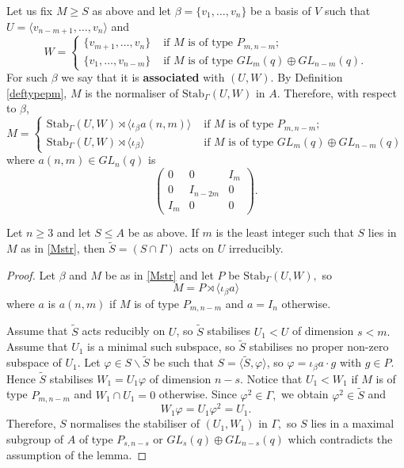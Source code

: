 Let us fix $M\ge S$ as above and let $\beta=\{v_1, \ldots, v_n\}$ be a basis of $V$ such that $U=\langle v_{n-m+1}, \ldots, v_n \rangle$ and 
$$W= \begin{cases}
\{v_{m+1}, \ldots, v_n\} &\text{ if } M \text{ is of type } P_{m, n-m};\\
\{v_1, \ldots, v_{n-m}\} &\text{ if } M \text{ is of type } GL_{m}(q) \oplus GL_{n-m}(q).
\end{cases} 
$$ 
For such $\beta$ we say that it is {\bf associated} with $(U,W).$
 By Definition \ref{deftypepm}, $M$ is the normaliser of $\mathrm{Stab}_{\Gamma}(U,W)$ in $A$. Therefore, with respect to $\beta$,
\begin{equation}
\label{Mstr}
M =\begin{cases}
\mathrm{Stab}_{\Gamma}(U,W) \rtimes \langle \iota_{\beta}a(n,m) \rangle & \text{ if } M \text{ is of type } P_{m, n-m};\\
\mathrm{Stab}_{\Gamma}(U,W) \rtimes \langle \iota_{\beta} \rangle & \text{ if } M \text{ is of type } GL_{m}(q) \oplus GL_{n-m}(q)
\end{cases}
\end{equation}
where $a(n,m) \in GL_n(q)$ is 
\begin{equation}
\label{adef}
\begin{pmatrix}
0 & 0 & I_{m} \\
0 & I_{n-2m} & 0 \\
I_{m} & 0 & 0
\end{pmatrix}.
\end{equation}

\begin{Lem}
\label{GRmmim2}
Let $n\ge 3$ and let $S \le A$ be as above. If $m$ is the least integer such that $S$ lies in $M$ as in \eqref{Mstr}, then 
 $\tilde{S}=(S \cap \Gamma)$ acts  on $U$ irreducibly.
\end{Lem} 
\begin{proof}
Let $\beta$ and $M$ be as in \eqref{Mstr} and let $P$ be $\mathrm{Stab}_{\Gamma}(U,W),$ so 
$$M=P \rtimes \langle \iota_{\beta} a\rangle$$
where $a$ is $a(n,m)$ if $M$ is of type $P_{m,n-m}$ and $a=I_n$ otherwise.


Assume that $\tilde{S}$ acts  reducibly on $U$, so  $\tilde{S}$ stabilises $U_1 <U$ of dimension $s<m.$  Assume that $U_1$ is a minimal such subspace, so $\tilde{S}$ stabilises no proper non-zero subspace of $U_1.$ Let $\varphi \in S \backslash \tilde{S}$ be such that
$S=\langle \tilde{S}, \varphi \rangle$, so $\varphi=\iota_{\beta}a \cdot g$ with $g \in P.$  Hence $\tilde{S}$ stabilises $W_1=U_1 \varphi$ of dimension  $n-s$. Notice that $U_1<W_1$ if $M$ is of type $P_{m,n-m}$ and $W_1 \cap U_1=0$ otherwise.
Since $\varphi^2 \in \Gamma,$ we obtain $\varphi^2 \in \tilde{S}$ and   $$W_1\varphi=U_1\varphi^2=U_1.$$
Therefore, $S$ normalises the stabiliser of $(U_1, W_1)$ in $\Gamma,$ so $S$ lies in a maximal subgroup of $A$ of type $P_{s, n-s}$ or $GL_{s}(q) \oplus GL_{n-s}(q)$  which contradicts the assumption of the lemma. 
\end{proof}


